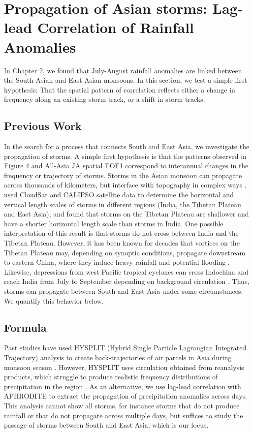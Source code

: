 \chapter{Propagation of Asian storms: Lag-lead Correlation of Rainfall Anomalies}

In Chapter 2, we found that July-August rainfall anomalies are linked between the South Asian and East Asian monsoons. In this section, we test a simple first hypothesis: That the spatial pattern of correlation reflects either a change in frequency along an existing storm track, or a shift in storm tracks.

\section{Previous Work} %
	
	In the search for a process that connects South and East Asia, we investigate the propagation of storms. A simple first hypothesis is that the patterns observed in Figure 4 and All-Asia JA spatial EOF1 correspond to interannual changes in the frequency or trajectory of storms. Storms in the Asian monsoon can propagate across thousands of kilometers, but interface with topography in complex ways \parencite{Romatschke2011a}. \cite{Luo2011} used CloudSat and CALIPSO satellite data to determine the horizontal and vertical length scales of storms in different regions (India, the Tibetan Plateau and East Asia), and found that storms on the Tibetan Plateau are shallower and have a shorter horizontal length scale than storms in India. One possible interpretation of this result is that storms do not cross between India and the Tibetan Plateau. However, it has been known for decades that vortices on the Tibetan Plateau may, depending on synoptic conditions, propagate downstream to eastern China, where they induce heavy rainfall and potential flooding \parencite{Tao1981,Murakami1984,Chen1984,Yasunari2006,Xu2011,Wang2012a}. Likewise, depressions from west Pacific tropical cyclones can cross Indochina and reach India from July to September depending on background circulation \parencite{Chen1999,Fudeyasu2006}. Thus, storms can propagate between South and East Asia under some circumstances. We quantify this behavior below.
	
\section{Formula}

	Past studies have used HYSPLIT (Hybrid Single Particle Lagrangian Integrated Trajectory) analysis to create back-trajectories of air parcels in Asia during monsoon season \parencite{Medina2010,Cai2012,Gao2013}. However, HYSPLIT uses circulation obtained from reanalysis products, which struggle to produce realistic frequency distributions of precipitation in the region \parencite{Pena-Arancibia2013}. As an alternative, we use lag-lead correlation with APHRODITE to extract the propagation of precipitation anomalies across days. This analysis cannot show all storms, for instance storms that do not produce rainfall or that do not propagate across multiple days, but suffices to study the passage of storms between South and East Asia, which is our focus.
	
